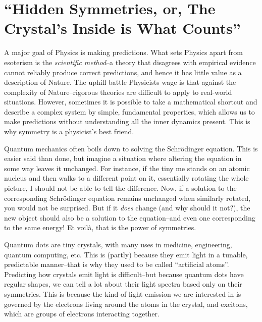
\section*{``Hidden Symmetries, or, The Crystal's Inside is What Counts''}
\thispagestyle{empty}

A major goal of Physics is making predictions. What sets Physics apart from esoterism is the \textit{scientific method}--a theory that disagrees with empirical evidence cannot reliably produce correct predictions, and hence it has little value as a description of Nature. The uphill battle Physicists wage is that against the complexity of Nature--rigorous theories are difficult to apply to real-world situations. However, sometimes it is possible to take a mathematical shortcut and describe a complex system by simple, fundamental properties, which allows us to make predictions without understanding all the inner dynamics present. This is why symmetry is a physicist's best friend.

Quantum mechanics often boils down to solving the Schrödinger equation. This is easier said than done, but imagine a situation where altering the equation in some way leaves it unchanged. For instance, if the tiny me stands on an atomic nucleus and then walks to a different point on it, essentially rotating the whole picture, I should not be able to tell the difference. Now, if a solution to the corresponding Schrödinger equation remains unchanged when similarly rotated, you would not be surprised. But if it \textit{does} change (and why should it not?), the new object should also be a solution to the equation--and even one corresponding to the same energy! Et voilà, that is the power of symmetries.

Quantum dots are tiny crystals, with many uses in medicine, engineering, quantum computing, etc. This is (partly) because they emit light in a tunable, predictable manner--that is why they used to be called ``artificial atoms''. Predicting how crystals emit light is difficult--but because quantum dots have regular shapes, we can tell a lot about their light spectra based only on their symmetries. This is because the kind of light emission we are interested in is governed by the electrons living around the atoms in the crystal, and excitons, which are groups of electrons interacting together.

